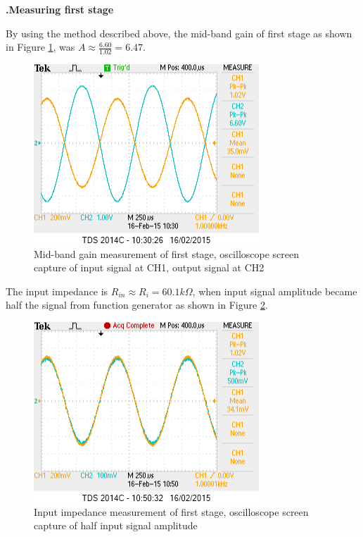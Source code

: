 \documentclass[a4paper,notitlepage,10pt]{report}
\newcommand{\tab}{\hspace{0.75cm}}
\newcommand{\fontSubHeading}{\fontsize{10pt}{11pt}\selectfont}
\newcounter{sections}
\newcounter{subsections}[sections]
\begin{document}
\begin{multicols}{2}
\fontSubHeading
{}
\textbf{.\tab Measuring first stage}

By using the method described above, the mid-band gain of first stage as shown in Figure \ref{fig:lab_ce_gain}, was $A \approx \frac{6.60}{1.02} = 6.47$.
\parskip=0pt

\begin{figure}[H]
	\centering
	\includegraphics[width=0.85\columnwidth]{labcegain}
	\caption{Mid-band gain measurement of first stage, oscilloscope screen capture of input signal at CH1, output signal at CH2}
	\label{fig:lab_ce_gain}
\end{figure}
\parskip=6pt

The input impedance is $R_{in} \approx R_i = 60.1k\Omega$, when input signal amplitude became half the signal from function generator as shown in Figure \ref{fig:lab_ce_rin}.
\parskip=0pt

\begin{figure}[H]
	\centering
	\includegraphics[width=0.85\columnwidth]{labcerin}
	\caption{Input impedance measurement of first stage, oscilloscope screen capture of half input signal amplitude}
	\label{fig:lab_ce_rin}
\end{figure}
\parskip=6pt


\end{multicols}
\end{document}
